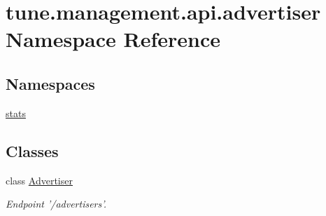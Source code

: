 \hypertarget{namespacetune_1_1management_1_1api_1_1advertiser}{\section{tune.\-management.\-api.\-advertiser Namespace Reference}
\label{namespacetune_1_1management_1_1api_1_1advertiser}
}
\subsection*{Namespaces}
\begin{DoxyCompactItemize}
\item 
\hyperlink{namespacetune_1_1management_1_1api_1_1advertiser_1_1stats}{stats}
\end{DoxyCompactItemize}
\subsection*{Classes}
\begin{DoxyCompactItemize}
\item 
class \hyperlink{classtune_1_1management_1_1api_1_1advertiser_1_1Advertiser}{Advertiser}
\begin{DoxyCompactList}\small\item\em Endpoint '/advertisers'. \end{DoxyCompactList}\end{DoxyCompactItemize}
